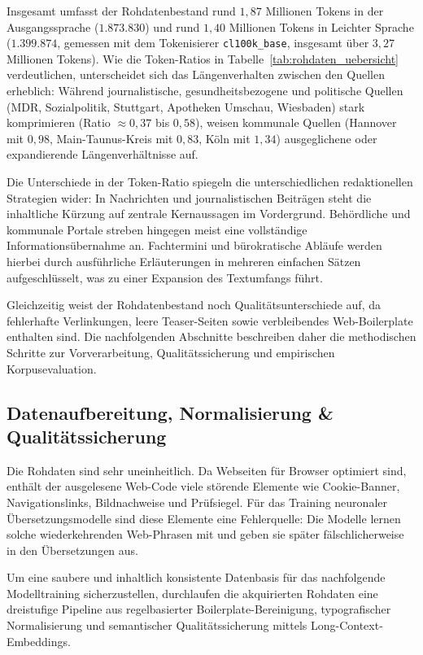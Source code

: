 Insgesamt umfasst der Rohdatenbestand rund $1{,}87$ Millionen Tokens in der Ausgangssprache ($1.873.830$) und rund $1{,}40$ Millionen Tokens in Leichter Sprache ($1.399.874$, gemessen mit dem Tokenisierer \texttt{cl100k\_base}, insgesamt über $3{,}27$ Millionen Tokens). Wie die Token-Ratios in Tabelle~\ref{tab:rohdaten_uebersicht} verdeutlichen, unterscheidet sich das Längenverhalten zwischen den Quellen erheblich: Während journalistische, gesundheitsbezogene und politische Quellen (MDR, Sozialpolitik, Stuttgart, Apotheken Umschau, Wiesbaden) stark komprimieren (Ratio $\approx 0{,}37$ bis $0{,}58$), weisen kommunale Quellen (Hannover mit $0{,}98$, Main-Taunus-Kreis mit $0{,}83$, Köln mit $1{,}34$) ausgeglichene oder expandierende Längenverhältnisse auf. 

Die Unterschiede in der Token-Ratio spiegeln die unterschiedlichen redaktionellen Strategien wider: In Nachrichten und journalistischen Beiträgen steht die inhaltliche Kürzung auf zentrale Kernaussagen im Vordergrund. Behördliche und kommunale Portale streben hingegen meist eine vollständige Informationsübernahme an. Fachtermini und bürokratische Abläufe werden hierbei durch ausführliche Erläuterungen in mehreren einfachen Sätzen aufgeschlüsselt, was zu einer Expansion des Textumfangs führt.

Gleichzeitig weist der Rohdatenbestand noch Qualitätsunterschiede auf, da fehlerhafte Verlinkungen, leere Teaser-Seiten sowie verbleibendes Web-Boilerplate enthalten sind. Die nachfolgenden Abschnitte beschreiben daher die methodischen Schritte zur Vorverarbeitung, Qualitätssicherung und empirischen Korpusevaluation.

\subsection{Datenaufbereitung, Normalisierung \& Qualitätssicherung}
\label{sec:datenbereinigung_normalisierung}

Die Rohdaten sind sehr uneinheitlich. Da Webseiten für Browser optimiert sind, enthält der ausgelesene Web-Code viele störende Elemente wie Cookie-Banner, Navigationslinks, Bildnachweise und Prüfsiegel. Für das Training neuronaler Übersetzungsmodelle sind diese Elemente eine Fehlerquelle: Die Modelle lernen solche wiederkehrenden Web-Phrasen mit und geben sie später fälschlicherweise in den Übersetzungen aus.

Um eine saubere und inhaltlich konsistente Datenbasis für das nachfolgende Modelltraining sicherzustellen, durchlaufen die akquirierten Rohdaten eine dreistufige Pipeline aus regelbasierter Boilerplate-Bereinigung, typografischer Normalisierung und semantischer Qualitätssicherung mittels Long-Context-Embeddings.


